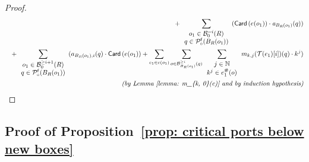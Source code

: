 \documentclass{article}
\theoremstyle{plain}
\newcommand{\Nat}{\ensuremath{\mathbb{N}}}
\newcommand{\taylor}[2]{\mathcal{T}(#1)[#2]}
\newcommand{\arity}[1]{{\textit{a}}_{#1}}
\newcommand{\Card}[1]{\textsf{Card}\left( #1 \right)}
\newcommand{\conclusionscirc}[1]{\mathcal{P}_\circ^{\textsf{f}}(#1)}
\newcommand{\exactboxesatzero}[2]{\mathcal{B}_{0}^{=#2}(#1)}
\newcommand{\boxesatzerogeq}[2]{\mathcal{B}_0^{\geq #2}(#1)}
\begin{document}
\begin{proof}
\begin{eqnarray*}
& & + \sum_{\begin{array}{c} o_1 \in \exactboxesatzero{R}{i}\\ q \in \conclusionscirc{B_R(o_1)} \end{array}} (\Card{e(o_1)} \cdot  \arity{B_R(o_1)}(q))\\
& &  + \sum_{\begin{array}{c} o_1 \in \boxesatzerogeq{R}{i+1}\\ q \in \conclusionscirc{B_R(o_1)} \end{array}
}  (a_{B_R(o_1), i}(q)  \cdot \Card{e(o_1)} + \sum_{e_1 \in e(o_1)} \sum_{o \in \mathcal{B}_{B_R(o_1)}^{\geq i}(q)} \sum_{\begin{array}{c} j \in \Nat\\ k^j \in e_1^\#(o) \end{array}} m_{k, j}(\taylor{e_1}{i})(q) \cdot k^j)    \\
& & \textit{(by Lemma~\ref{lemma: m_{k, 0}(c)} and by induction hypothesis)} \allowdisplaybreaks\\
\end{eqnarray*}
\end{proof}

\subsection{Proof of Proposition~\ref{prop: critical ports below new boxes}}
\end{document}
